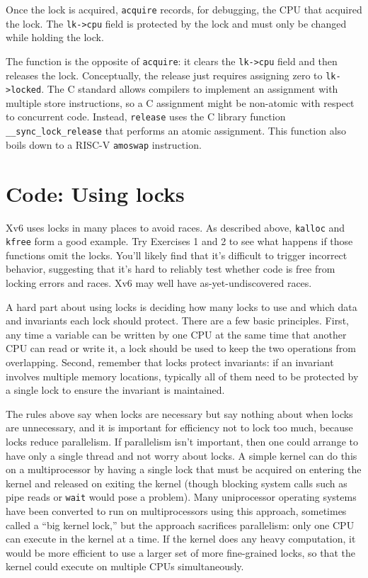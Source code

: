 Once the lock is acquired,
\lstinline{acquire}
records, for debugging, the CPU 
that acquired the lock.
The
\lstinline{lk->cpu}
field is protected by the lock
and must only be changed while holding the lock.

The function
is the opposite of 
\lstinline{acquire}:
it clears the 
\lstinline{lk->cpu}
field
and then releases the lock.
Conceptually, the release just requires assigning zero to
\lstinline{lk->locked}.
The C standard allows compilers to implement an assignment
with multiple store instructions,
so a C assignment might be non-atomic with respect
to concurrent code.
Instead,
\lstinline{release}
uses the C library function
\lstinline{__sync_lock_release}
that performs an atomic assignment.
This function also boils down to a RISC-V
\lstinline{amoswap}
instruction.
\section{Code: Using locks}
Xv6 uses locks in many places to avoid races.
As described above,
\lstinline{kalloc}
and
\lstinline{kfree}
form a good example.
Try Exercises 1 and 2 to see what happens if those
functions omit the locks.
You'll likely find that it's difficult to trigger incorrect
behavior, suggesting that it's hard to reliably test whether code
is free from locking errors and races.
Xv6 may well have as-yet-undiscovered races.

A hard part about using locks is deciding how many locks
to use and which data and invariants each lock should protect.
There are a few basic principles.
First, any time a variable can be written by one CPU
at the same time that another CPU can read or write it,
a lock should be used to keep the two
operations from overlapping.
Second, remember that locks protect invariants:
if an invariant involves multiple memory locations,
typically all of them need to be protected
by a single lock to ensure the invariant is maintained.

The rules above say when locks are necessary but say nothing about when locks
are unnecessary, and it is important for efficiency not to lock too much,
because locks reduce parallelism.  If parallelism isn't important, then one
could arrange to have only a single thread and not worry about locks.  A simple
kernel can do this on a multiprocessor by having a single lock that must be
acquired on entering the kernel and released on exiting the kernel (though
blocking system calls such as pipe reads or
\lstinline{wait}
would pose a problem).  Many uniprocessor operating systems have been converted to
run on multiprocessors using this approach, sometimes called a ``big
kernel lock,'' but the approach sacrifices parallelism: only one
CPU can execute in the kernel at a time.  If the kernel does any heavy
computation, it would be more efficient to use a larger set of more
fine-grained locks, so that the kernel could execute on multiple CPUs
simultaneously.

